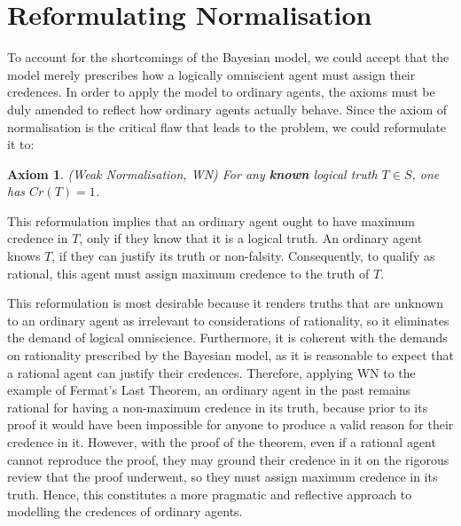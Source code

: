 \documentclass[12pt]{article}
\newtheorem{axiom}{Axiom}
\begin{document}
\section{Reformulating Normalisation}
To account for the shortcomings of the Bayesian model, we could accept that the model merely prescribes how a logically omniscient agent must assign their credences. In order to apply the model to ordinary agents, the axioms must be duly amended to reflect how ordinary agents actually behave. Since the axiom of normalisation is the critical flaw that leads to the problem, we could reformulate it to:
\begin{axiom}
    (Weak Normalisation, WN) For any \textbf{known} logical truth $T\in S$, one has $Cr(T)=1$.
\end{axiom}
This reformulation implies that an ordinary agent ought to have maximum credence in $T$, only if they know that it is a logical truth.\autocite{sep} An ordinary agent knows $T$, if they can justify its truth or non-falsity. Consequently, to qualify as rational, this agent must assign maximum credence to the truth of $T$.

This reformulation is most desirable because it renders truths that are unknown to an ordinary agent as irrelevant to considerations of rationality, so it eliminates the demand of logical omniscience. Furthermore, it is coherent with the demands on rationality prescribed by the Bayesian model, as it is reasonable to expect that a rational agent can justify their credences. Therefore, applying WN to the example of Fermat's Last Theorem, an ordinary agent in the past remains rational for having a non-maximum credence in its truth, because prior to its proof it would have been impossible for anyone to produce a valid reason for their credence in it. However, with the proof of the theorem, even if a rational agent cannot reproduce the proof, they may ground their credence in it on the rigorous review that the proof underwent, so they must assign maximum credence in its truth. Hence, this constitutes a more pragmatic and reflective approach to modelling the credences of ordinary agents.
\end{document}
